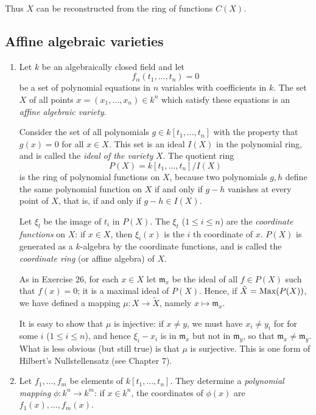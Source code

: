 \documentclass[class=book, crop=false]{standalone}
\theoremstyle{definition}
\theoremstyle{remark}
\begin{document}
\begin{enumerate}[resume*=exc1]
\begin{enumerate}[i)]
Thus $X$ can be reconstructed from the ring of functions $C(X)$.
\end{enumerate}
\end{enumerate}

\subsection*{Affine algebraic varieties}
\begin{enumerate}[resume*=exc1]
  \item Let $k$ be an algebraically closed field and let
  \[
  f_{\alpha}\left(t_{1}, \ldots, t_{n}\right)=0
\]
be a set of polynomial equations in $n$ variables with coefficients in $k$. The
set $X$ of all points $x=\left(x_{1}, \ldots, x_{n}\right) \in k^{n}$ which
satisfy these equations is an \textit{affine algebraic variety}.

Consider the set of all polynomials $g \in k\left[t_{1}, \ldots, t_{n}\right]$
with the property that $g(x)=0$ for all $x \in X$. This set is an ideal $I(X)$
in the polynomial ring, and is called the \textit{ideal of the variety} $X$. The quotient ring
\[
  P(X)=k\left[t_{1}, \ldots, t_{n}\right] / I(X)
\]
is the ring of polynomial functions on $X$, because two polynomials $g, h$
define the same polynomial function on $X$ if and only if $g-h$ vanishes at
every point of $X$, that is, if and only if $g-h \in I(X)$.

Let $\xi_{l}$ be the
image of $t_{i}$ in $P(X)$. The $\xi_{t}$ ($1 \leq i \leq n$) are the \textit{coordinate
functions} on $X$: if $x \in X$, then $\xi_{i}(x)$ is the $i$ th coordinate of
$x$. $P(X)$ is generated as a $k$-algebra by the coordinate functions, and is
called the \textit{coordinate ring} (or affine algebra) of $X$.

As in Exercise 26, for each $x \in X$ let $\mathfrak{m}_{x}$ be the ideal of all
$f \in P(X)$ such that $f(x)=0$; it is a maximal ideal of $P(X)$. Hence, if
$\tilde{X}=\operatorname{Max}(P(X))$, we have defined a mapping
$\mu: X \to \tilde{X}$, namely $x \mapsto \mathfrak{m}_{x}$.

It is easy to show that $\mu$ is injective: if $x \neq y$, we must have
$x_{i} \neq y_{i}$ for for some $i$ ($1 \leq i \leq n$), and hence $\xi_{i}-x_{i}$
is in $\mathfrak{m}_{x}$ but not in $\mathfrak{m}_{y}$, so that
$\mathfrak{m}_{x} \neq \mathfrak{m}_{y}$. What is less obvious (but still true)
is that $\mu$ is surjective. This is one form of Hilbert's Nullstellensatz (see
Chapter 7).

\item Let $f_{1}, \ldots, f_{m}$ be elements of
        $k\left[t_{1}, \ldots, t_{n}\right]$. They determine a \textit{polynomial
        mapping} $\phi: k^{n} \to k^{m}$: if $x \in k^{n}$, the coordinates of
        $\phi(x)$ are $f_{1}(x), \ldots, f_{m}(x)$.


\end{enumerate}
\end{document}
